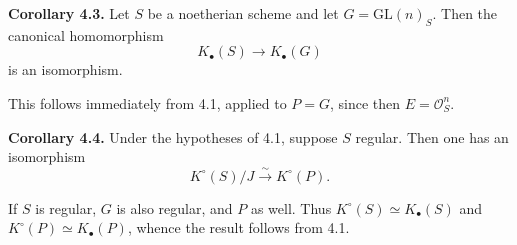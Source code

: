 \textbf{Corollary 4.3.} Let $S$ be a noetherian scheme and let $G=\mathrm{GL}(n)_S$. Then the canonical homomorphism
\[
 K_\bullet(S)\longrightarrow K_\bullet(G)
\]
is an isomorphism.

This follows immediately from 4.1, applied to $P=G$, since then $E=\mathcal O_S^n$.

\textbf{Corollary 4.4.} Under the hypotheses of 4.1, suppose $S$ regular. Then one has an isomorphism
\[
 K^\circ(S)/J\xrightarrow{\sim}K^\circ(P).
\]

If $S$ is regular, $G$ is also regular, and $P$ as well. Thus $K^\circ(S)\simeq K_\bullet(S)$ and $K^\circ(P)\simeq K_\bullet(P)$, whence the result follows from 4.1.
